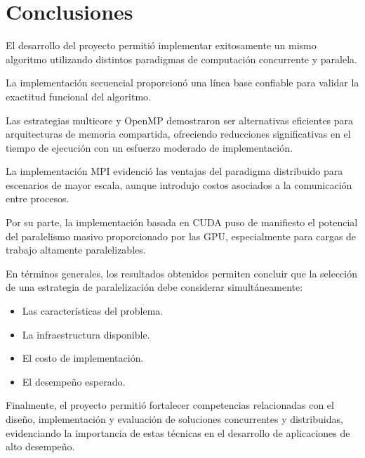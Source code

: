 \chapter{Conclusiones}

El desarrollo del proyecto permitió implementar exitosamente un mismo algoritmo utilizando distintos paradigmas de computación concurrente y paralela.

La implementación secuencial proporcionó una línea base confiable para validar la exactitud funcional del algoritmo.

Las estrategias multicore y OpenMP demostraron ser alternativas eficientes para arquitecturas de memoria compartida, ofreciendo reducciones significativas en el tiempo de ejecución con un esfuerzo moderado de implementación.

La implementación MPI evidenció las ventajas del paradigma distribuido para escenarios de mayor escala, aunque introdujo costos asociados a la comunicación entre procesos.

Por su parte, la implementación basada en CUDA puso de manifiesto el potencial del paralelismo masivo proporcionado por las GPU, especialmente para cargas de trabajo altamente paralelizables.

En términos generales, los resultados obtenidos permiten concluir que la selección de una estrategia de paralelización debe considerar simultáneamente:

\begin{itemize}
    \item Las características del problema.
    \item La infraestructura disponible.
    \item El costo de implementación.
    \item El desempeño esperado.
\end{itemize}

Finalmente, el proyecto permitió fortalecer competencias relacionadas con el diseño, implementación y evaluación de soluciones concurrentes y distribuidas, evidenciando la importancia de estas técnicas en el desarrollo de aplicaciones de alto desempeño.
